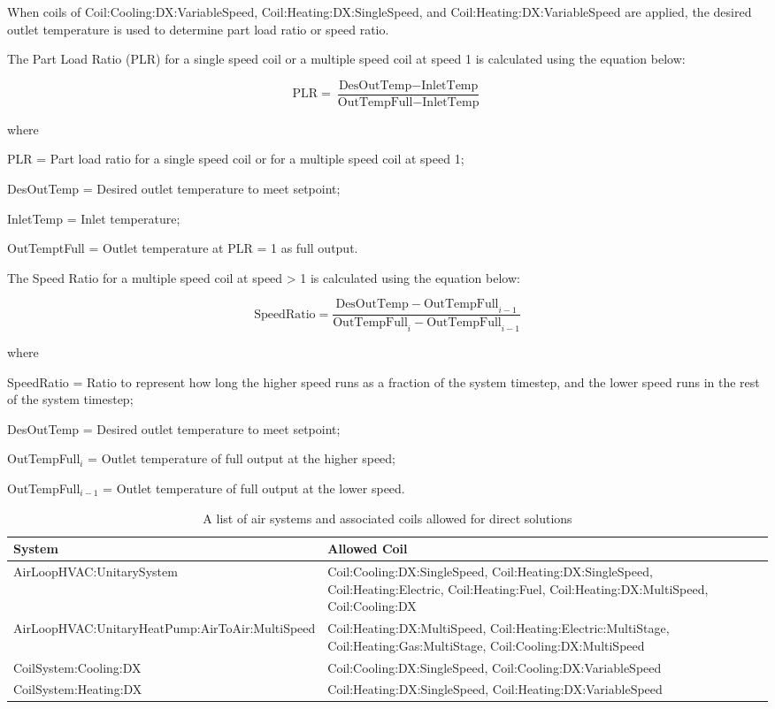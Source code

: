 When coils of Coil:Cooling:DX:VariableSpeed, Coil:Heating:DX:SingleSpeed, and Coil:Heating:DX:VariableSpeed are applied, the desired outlet temperature is used to determine part load ratio or speed ratio.

The Part Load Ratio (PLR) for a single speed coil or a multiple speed coil at speed 1 is calculated using the equation below:

\begin{equation}
    \textrm{PLR} = \frac{\textrm{DesOutTemp} - \textrm{InletTemp}}{\textrm{OutTempFull} - \textrm{InletTemp}}
\end{equation}

where

PLR = Part load ratio for a single speed coil or for a multiple speed coil at speed 1;

DesOutTemp = Desired outlet temperature to meet setpoint;

InletTemp = Inlet temperature;

OutTemptFull = Outlet temperature at PLR = 1 as full output.

The Speed Ratio for a multiple speed coil at speed > 1 is calculated using the equation below:

\begin{equation}
    \textrm{SpeedRatio} = \frac{\textrm{DesOutTemp} - \textrm{OutTempFull}_{i-1}}{\textrm{OutTempFull}_{i} - \textrm{OutTempFull}_{i-1}}
\end{equation}

where

SpeedRatio = Ratio to represent how long the higher speed runs as a fraction of the system timestep, and the lower speed runs in the rest of the system timestep;

DesOutTemp = Desired outlet temperature to meet setpoint;

OutTempFull$_{i}$ = Outlet temperature of full output at the higher speed;

OutTempFull$_{i-1}$ = Outlet temperature of full output at the lower speed.

\begin{longtable}[c]{p{4in}p{2.5in}}
    \caption{A list of air systems and associated coils allowed for direct solutions\label{table:a_list_of_air_systems_and_associated_coils_allowed_for_direct solutions}} \tabularnewline
    \toprule
    System & Allowed Coil \tabularnewline
    \midrule
    \endfirsthead

    AirLoopHVAC:UnitarySystem & Coil:Cooling:DX:SingleSpeed, Coil:Heating:DX:SingleSpeed, Coil:Heating:Electric, Coil:Heating:Fuel,  Coil:Heating:DX:MultiSpeed, Coil:Cooling:DX\tabularnewline
    AirLoopHVAC:UnitaryHeatPump:AirToAir:MultiSpeed & Coil:Heating:DX:MultiSpeed, Coil:Heating:Electric:MultiStage, Coil:Heating:Gas:MultiStage, Coil:Cooling:DX:MultiSpeed\tabularnewline
    CoilSystem:Cooling:DX & Coil:Cooling:DX:SingleSpeed, Coil:Cooling:DX:VariableSpeed \tabularnewline
    CoilSystem:Heating:DX & Coil:Heating:DX:SingleSpeed, Coil:Heating:DX:VariableSpeed \tabularnewline

    \bottomrule
\end{longtable}


